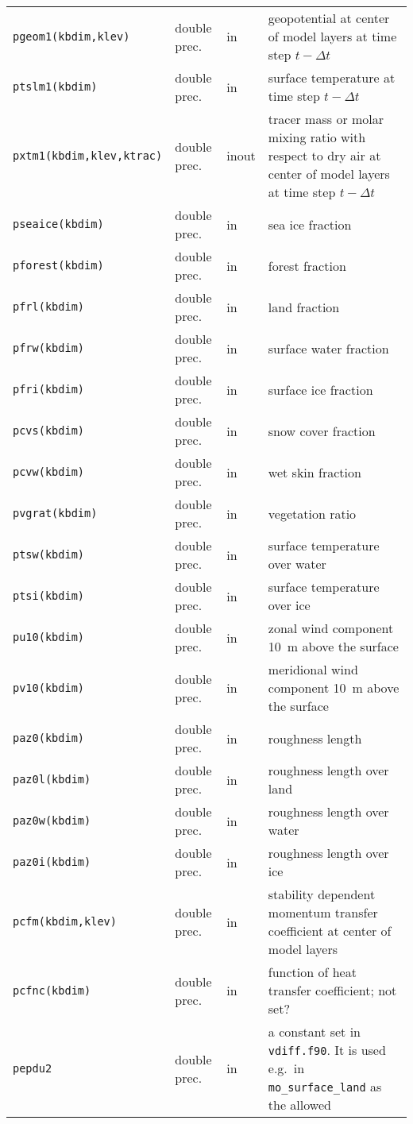 \begin{longtable}{l@{\extracolsep\fill}llp{7.0cm}}
{\tt pgeom1(kbdim,klev)} & double prec. & in & geopotential at center
of model layers at time step $t-\Delta t$\\
{\tt ptslm1(kbdim)} & double prec. & in & surface temperature at time
step $t-\Delta t$ \\
{\tt pxtm1(kbdim,klev,ktrac)} & double prec. & inout & tracer mass or
molar mixing ratio with respect to dry air at center of model layers at
time step $t-\Delta t$\\
{\tt pseaice(kbdim)} & double prec. & in & sea ice fraction \\
{\tt pforest(kbdim)} & double prec. & in & forest fraction \\
{\tt pfrl(kbdim)} & double prec. & in & land fraction \\
{\tt pfrw(kbdim)} & double prec. & in & surface water fraction \\
{\tt pfri(kbdim)} & double prec. & in & surface ice fraction \\
{\tt pcvs(kbdim)} & double prec. & in & snow cover fraction \\
{\tt pcvw(kbdim)} & double prec. & in & wet skin fraction \\
{\tt pvgrat(kbdim)} & double prec. & in & vegetation ratio \\
{\tt ptsw(kbdim)} & double prec. & in & surface temperature over water \\
{\tt ptsi(kbdim)} & double prec. & in & surface temperature over ice\\
{\tt pu10(kbdim)} & double prec. & in & zonal wind component 10~m
above the surface \\
{\tt pv10(kbdim)} & double prec. & in & meridional wind component 10~m
above the surface \\
{\tt paz0(kbdim)} & double prec. & in & roughness length \\
{\tt paz0l(kbdim)} & double prec. & in & roughness length over land \\
{\tt paz0w(kbdim)} & double prec. & in & roughness length over water \\
{\tt paz0i(kbdim)} & double prec. & in & roughness length over ice\\
{\tt pcfm(kbdim,klev)} & double prec. & in & stability dependent
momentum transfer coefficient at center of model layers \\
{\tt pcfnc(kbdim)} & double prec. & in & function of heat transfer
coefficient; not set? \\
{\tt pepdu2} & double prec. & in & a constant set in {\tt
  vdiff.f90}. It is used e.g.~in {\tt mo\_surface\_land} as the allowed

\end{longtable}
